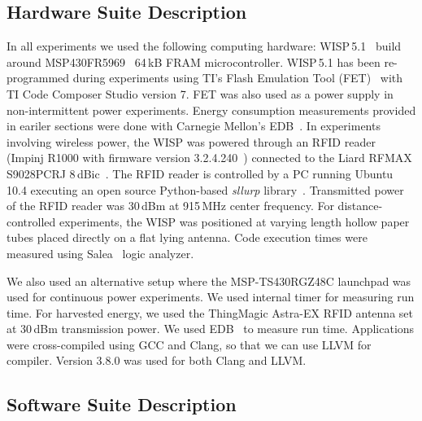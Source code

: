 
\subsection{Hardware Suite Description}
\label{sec:results_hardware}

In all experiments we used the following computing hardware: WISP\,5.1~\cite{wisp5,wisp} build around MSP430FR5969~\cite{wolverine} 64\,kB FRAM microcontroller. WISP\,5.1 has been re-programmed during experiments using TI's Flash Emulation Tool (FET)~\cite{fet} with TI Code Composer Studio version 7. FET was also used as a power supply in non-intermittent power experiments. Energy consumption measurements provided in eariler sections were done with Carnegie Mellon's EDB~\cite{edb}. In experiments involving wireless power, the WISP was powered through an RFID reader (Impinj R1000 with firmware version 3.2.4.240~\cite{r1000_data_sheet}) connected to the Liard RFMAX S9028PCRJ 8\,dBic~\cite{atlas2015}. The RFID reader is controlled by a PC running Ubuntu 10.4 executing an open source Python-based \emph{sllurp} library~\cite{sllrp_github}. Transmitted power of the RFID reader was 30\,dBm at 915\,MHz center frequency. For distance-controlled experiments, the WISP was positioned at varying length hollow paper tubes placed directly on a flat lying antenna. Code execution times were measured using Salea~\cite{saleae} logic analyzer.

We also used an alternative setup where the MSP-TS430RGZ48C launchpad was used for continuous power experiments. We used internal timer for measuring run time. For harvested energy, we used the ThingMagic Astra-EX RFID antenna set at 30\,dBm transmission power. We used EDB~\cite{edb} to measure run time. Applications were cross-compiled using GCC and Clang, so that we can use LLVM for \sys compiler. Version 3.8.0 was used for both Clang and LLVM.

\subsection{Software Suite Description}
\label{sec:results_software}

